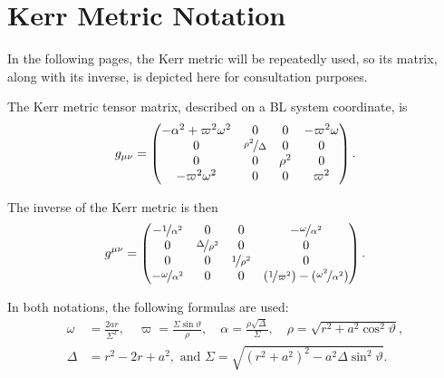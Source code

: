 \section{Kerr Metric Notation}

In the following pages, the Kerr metric will be repeatedly used, so its matrix, along with its inverse, is depicted here for consultation purposes.

The Kerr metric tensor matrix, described on a \ac{BL} system coordinate, is
\[
	g_{\mu\nu} = \begin{pmatrix}
		-\alpha^2 + \varpi^2\omega^2 & 0 & 0 & -\varpi^2\omega \\
		0 & \nicefrac{\rho^2}{\Delta} & 0 & 0 \\
		0 & 0 & \rho^2 & 0 \\
		-\varpi^2\omega^2 & 0 & 0 & \varpi^2
	\end{pmatrix}.
\]

The inverse of the Kerr metric is then
\[
	g^{\mu\nu} = \begin{pmatrix}
		-\nicefrac{1}{\alpha^2} & 0 & 0 & -\nicefrac{\omega}{\alpha^2} \\
		0 & \nicefrac{\Delta}{\rho^2} & 0 & 0 \\
		0 & 0 & \nicefrac{1}{\rho^2} & 0 \\
		-\nicefrac{\omega}{\alpha^2} & 0 & 0 & (\nicefrac{1}{\varpi^2}) - (\nicefrac{\omega^2}{\alpha^2})
	\end{pmatrix}.
\]


In both notations, the following formulas are used:
\begin{align}
	\omega &= \frac{2ar}{\Sigma^2},  \quad \varpi = \frac{\Sigma\sin\vartheta}{\rho}, \quad \alpha = \frac{\rho\sqrt{\Delta}}{\Sigma}, \quad \rho = \sqrt{r^2 + a^2\cos^2\vartheta},\nonumber\\
	\Delta &= r^2 - 2r + a^2, \textrm{ and } \Sigma = \sqrt{(r^2+a^2)^2 - a^2\Delta\sin^2\vartheta}.
	\label{eq:termdef}
\end{align}
